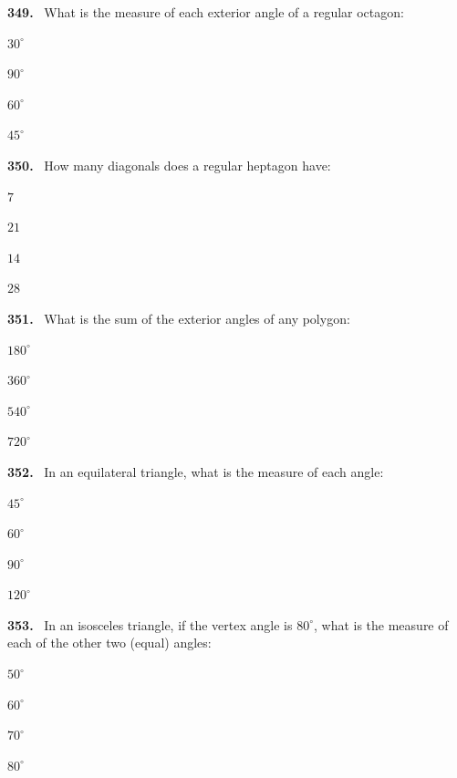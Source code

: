 \documentclass[11pt]{article}
\newenvironment{qenv}[1]{%
  \par\medskip\noindent\textbf{#1.}\ \ignorespaces
}{\par}
\begin{document}
\begin{qenv}{349} What is the measure of each exterior angle of a regular octagon:
\begin{options} \item $30^{\circ}$ \item $90^{\circ}$ \item $60^{\circ}$ \item $45^{\circ}$ \end{options} \end{qenv}

\begin{qenv}{350} How many diagonals does a regular heptagon have:
\begin{options} \item $7$ \item $21$ \item $14$ \item $28$ \end{options} \end{qenv}

\begin{qenv}{351} What is the sum of the exterior angles of any polygon:
\begin{options} \item $180^{\circ}$ \item $360^{\circ}$ \item $540^{\circ}$ \item $720^{\circ}$ \end{options} \end{qenv}

\begin{qenv}{352} In an equilateral triangle, what is the measure of each angle:
\begin{options} \item $45^{\circ}$ \item $60^{\circ}$ \item $90^{\circ}$ \item $120^{\circ}$ \end{options} \end{qenv}

\begin{qenv}{353} In an isosceles triangle, if the vertex angle is $80^{\circ}$, what is the measure of each of the other two (equal) angles:
\begin{options} \item $50^{\circ}$ \item $60^{\circ}$ \item $70^{\circ}$ \item $80^{\circ}$ \end{options} \end{qenv}
\end{document}
